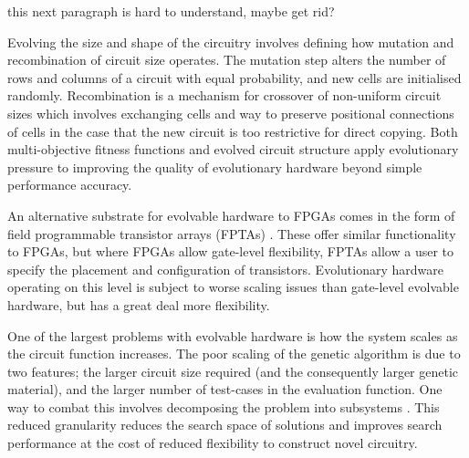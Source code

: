 \todo this next paragraph is hard to understand, maybe get rid?

Evolving the size and shape of the circuitry involves defining how mutation and recombination
of circuit size operates. The mutation step alters the number of rows and columns of a circuit
with equal probability, and new cells are initialised randomly. Recombination is a
mechanism for crossover of non-uniform circuit sizes which involves exchanging cells
and way to preserve positional connections of cells in the case that the new circuit
is too restrictive for direct copying.
Both multi-objective fitness functions and evolved circuit structure
apply evolutionary pressure to improving the quality of evolutionary hardware
beyond simple performance accuracy.

An alternative substrate for evolvable hardware to FPGAs comes in the form of field
programmable transistor arrays (FPTAs) \cite{869347}. These offer similar functionality
to FPGAs, but where FPGAs allow gate-level flexibility, FPTAs allow a user to specify
the placement and configuration of transistors. Evolutionary hardware operating on this
level is subject to worse scaling issues than gate-level evolvable hardware, but has a
great deal more flexibility.

One of the largest problems with evolvable hardware is how the system scales as the
circuit function increases. The poor scaling of the genetic algorithm is due to two
features; the larger circuit size required (and the consequently larger genetic material),
and the larger number of test-cases in the evaluation function. One way to combat this
involves decomposing the problem into subsystems \cite{10.1007/978-3-540-46239-2_5}.
This reduced granularity reduces the search space of solutions and improves search
performance at the cost of reduced flexibility to construct novel circuitry.

